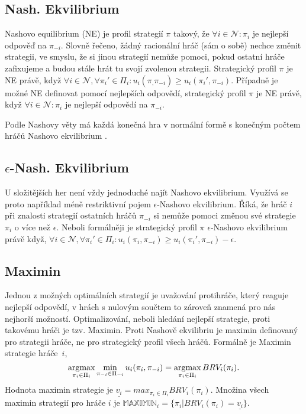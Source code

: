 \subsection{Nash. Ekvilibrium}

Nashovo equilibrium (NE) je profil strategií $\pi$ takový, že $\forall i \in \mathcal{N}: \pi_i$ je nejlepší odpověď na $\pi_{-i}$. Slovně řečeno, žádný racionální hráč (sám o sobě) nechce změnit strategii, ve smyslu, že si jinou strategií nemůže pomoci, pokud ostatní hráče zafixujeme a budou stále hrát tu svojí zvolenou strategii. Strategický profil $\pi$ je NE právě, když $\forall i \in \mathcal{N}, \forall \pi_i' \in \Pi_i: u_i(\pi_, \pi_{-i}) \geq u_i(\pi_i', \pi_{-i})$. Případně je možné NE definovat pomocí nejlepších odpovědí, strategický profil $\pi$ je NE právě, když $\forall i \in \mathcal{N}: \pi_i$ je nejlepší odpovědí na $\pi_{-i}$. \cite{Schmid}

Podle Nashovy věty má každá konečná hra v normální formě s konečným počtem hráčů Nashovo ekvilibrium \cite{Balko}.  

\subsection{$\epsilon$-Nash. Ekvilibrium}

U složitějších her není vždy jednoduché najít Nashovo ekvilibrium. Využívá se proto například méně restriktivní pojem $\epsilon$-Nashovo ekvilibrium. Říká, že hráč $i$ při znalosti strategií ostatních hráčů $\pi_{-i}$ si nemůže pomoci změnou své strategie $\pi_i$ o více než $\epsilon$.  
Neboli formálněji je strategický profil $\pi$ $\epsilon$-Nashovo ekvilibrium právě když, $\forall i \in \mathcal{N}, \forall \pi_i' \in \Pi_i: u_i(\pi_i, \pi_{-i}) \geq u_i(\pi_i', \pi_{-i}) - \epsilon$. \cite{Balko} 


\subsection{Maximin}

Jednou z možných optimálních strategií je uvažování protihráče, který reaguje nejlepší odpovědí, v hrách s nulovým součtem to zároveň znamená pro nás nejhorší možností. Optimalizování, neboli hledání nejlepší strategie, proti takovému hráči je tzv. Maximin.
Proti Nashově ekvilibriu je maximin definovaný pro strategii hráče, ne pro strategický profil všech hráčů. Formálně je Maximin strategie hráče~$i$,
\begin{equation}
    \operatorname*{argmax}_{\pi_i \in \Pi_i} \min_{\pi_{-i} \in \Pi_{-i}} u_i(\pi_i, \pi_{-i}) = \operatorname*{argmax}_{\pi_i \in \Pi_i} BRV_i(\pi_i)
\hbox{.}\end{equation}
Hodnota maximin strategie je $\underline{v_i} = max_{\pi_i \in \Pi_i} BRV_i(\pi_i)$.
Množina všech maximin strategií pro hráče $i$ je $\mathbb{MAXIMIN}_i = \{\pi_i | BRV_i(\pi_i) = \underline{v_i}\}$.\cite{Schmid}



